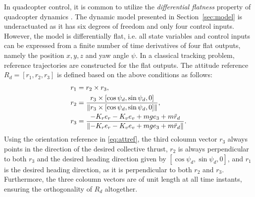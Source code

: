 In quadcopter control, it is common to utilize the \textit{differential flatness} property of quadcopter dynamics \cite{flatness}. The dynamic model presented in Section~\ref{sec:model} is underactuated as it has six degrees of freedom and only four control inputs. However, the model is differentially flat, i.e. all state variables and control inputs can be expressed from a finite number of time derivatives of four flat outputs, namely the position $x,y,z$ and yaw angle $\psi$.  In a classical tracking problem, reference trajectories are constructed for the flat outputs. The attitude reference $R_d=[r_1, r_2, r_3]$ is defined based on the above conditions as follows:
\begin{subequations}\label{eq:attref}
\begin{align}
    r_1 &= r_2\times r_3,\\
    r_2 &= \frac{r_3\times [\cos\psi_d, \sin\psi_d, 0]}{\norm{r_3\times [\cos\psi_d, \sin\psi_d, 0]}},\\
    r_3 &= \frac{-K_r e_r - K_v e_v + m g e_3+m \ddot r_d}{\norm{-K_r e_r - K_v e_v + m g e_3+m \ddot r_d}}.
\end{align}
\end{subequations}
Using the orientation reference in \eqref{eq:attref}, the third coloumn vector $r_3$ always points in the direction of the desired collective thrust, $r_2$ is always perpendicular to both $r_3$ and the desired heading direction given by $[\cos\psi_d, \sin\psi_d, 0]$, and $r_1$ is the desired heading direction, as it is perpendicular to both $r_2$ and $r_3$. Furthermore, the three coloumn vectors are of unit length at all time instants, ensuring the orthogonality of $R_d$ altogether.

